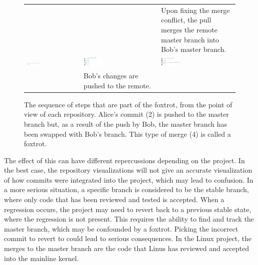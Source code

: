 \begin{figure}[htbp]
\begin{tabulary}{\textwidth}{LLL}
    &
    &
    \tiny{Upon fixing the merge conflict, the pull merges the remote master
    branch into Bob's master branch.}
    \\

    \includegraphics[width=0.27\textwidth]{Figures/background/foxtrot/alice_2.png} &
    \includegraphics[width=0.27\textwidth]{Figures/background/foxtrot/origin_3.png} &
    \includegraphics[width=0.27\textwidth]{Figures/background/foxtrot/bob_4.png} \\

    &
    \tiny{Bob's changes are pushed to the remote.}
    &
    \\

  \end{tabulary}
  \caption{The sequence of steps that are part of the foxtrot, from the
  point of view of each repository. Alice's commit (2) is pushed to the
  master branch but, as a result of the push by Bob, the master branch
  has been swapped with Bob's branch. This type of merge (4) is called a
  foxtrot.}
  \label{fig:FoxtrotSteps}
\end{figure}

The effect of this can have different repercussions depending on the
project.
In the best case, the repository visualizations will not give an
accurate visualization of how commits were integrated into the project,
which may lead to confusion.
In a more serious situation, a specific branch is considered to be the
stable branch, where only code that has been reviewed and tested is
accepted.
When a regression occurs, the project may need to revert back to a
previous stable state, where the regression is not present.
This requires the ability to find and track the master branch, which may
be confounded by a foxtrot.
Picking the incorrect commit to revert to could lead to serious
consequences.
In the Linux project, the merges to the master branch are
the code that Linus has reviewed and accepted into the mainline kernel.

